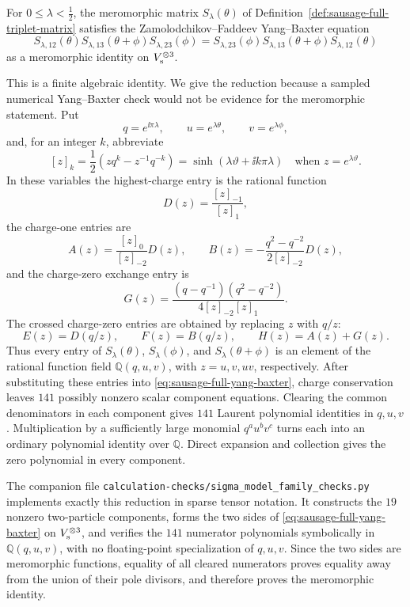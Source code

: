 \begin{example}
\label{ex:sausage-foz-factorization}
For \(0\le\lambda<\frac12\), the meromorphic matrix
\(S_\lambda(\theta)\) of
Definition~\ref{def:sausage-full-triplet-matrix} satisfies the
Zamolodchikov--Faddeev Yang--Baxter equation
\begin{equation}
  S_{\lambda,12}(\theta)S_{\lambda,13}(\theta+\phi)
  S_{\lambda,23}(\phi)
  =
  S_{\lambda,23}(\phi)S_{\lambda,13}(\theta+\phi)
  S_{\lambda,12}(\theta)
  \label{eq:sausage-full-yang-baxter}
\end{equation}
as a meromorphic identity on \(V_{\rm s}^{\otimes3}\).

This is a finite algebraic identity.  We give the reduction because a sampled
numerical Yang--Baxter check would not be evidence for the meromorphic
statement.  Put
\[
  q=e^{\ii\pi\lambda},\qquad
  u=e^{\lambda\theta},\qquad
  v=e^{\lambda\phi},
\]
and, for an integer \(k\), abbreviate
\[
  [z]_k=\frac12\left(zq^k-z^{-1}q^{-k}\right)
  =\sinh(\lambda\vartheta+\ii k\pi\lambda)
  \quad\text{when }z=e^{\lambda\vartheta}.
\]
In these variables the highest-charge entry is the rational function
\[
  D(z)=\frac{[z]_{-1}}{[z]_{1}},
\]
the charge-one entries are
\[
  A(z)=\frac{[z]_0}{[z]_{-2}}D(z),\qquad
  B(z)=-\frac{q^2-q^{-2}}{2[z]_{-2}}D(z),
\]
and the charge-zero exchange entry is
\[
  G(z)=
  \frac{(q-q^{-1})(q^2-q^{-2})}
  {4[z]_{-2}[z]_{1}} .
\]
The crossed charge-zero entries are obtained by replacing \(z\) with \(q/z\):
\[
  E(z)=D(q/z),\qquad F(z)=B(q/z),\qquad H(z)=A(z)+G(z).
\]
Thus every entry of \(S_\lambda(\theta)\), \(S_\lambda(\phi)\), and
\(S_\lambda(\theta+\phi)\) is an element of the rational function field
\(\mathbb Q(q,u,v)\), with \(z=u,v,uv\), respectively.  After substituting
these entries into
\eqref{eq:sausage-full-yang-baxter}, charge conservation leaves \(141\)
possibly nonzero scalar component equations.  Clearing the common
denominators in each component gives \(141\) Laurent polynomial identities in
\(q,u,v\).  Multiplication by a sufficiently large monomial \(q^a u^b v^c\)
turns each into an ordinary polynomial identity over \(\mathbb Q\).  Direct
expansion and collection gives the zero polynomial in every component.

The companion file \texttt{calculation-checks/sigma\_model\_family\_checks.py}
implements exactly this reduction in sparse tensor notation.  It constructs
the \(19\) nonzero two-particle components, forms the two sides of
\eqref{eq:sausage-full-yang-baxter} on \(V_{\rm s}^{\otimes3}\), and verifies
the \(141\) numerator polynomials symbolically in \(\mathbb Q(q,u,v)\), with
no floating-point specialization of \(q,u,v\).  Since the two sides are
meromorphic functions, equality of all cleared numerators proves equality
away from the union of their pole divisors, and therefore proves the
meromorphic identity.
\end{example}

